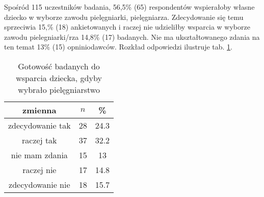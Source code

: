 


Spośród 115 uczestników badania, 56,5\% (65) respondentów wspierałoby własne dziecko w wyborze zawodu pielęgniarki, pielęgniarza. Zdecydowanie się temu sprzeciwia 15,\% (18) ankietowanych i raczej nie udzieliłby wsparcia w wyborze zawodu pielegniarki/rza 14,8\% (17) badanych. Nie ma ukształtowanego zdania na ten temat 13\% (15) opniniodawców. Rozkład odpowiedzi ilustruje tab. \ref{tab:Q37}.

\begin{table}[H]
\caption{Gotowość badanych do wsparcia dziecka, gdyby wybrało pielęgniarstwo}
\centering
\begin{tabular}{ | c | c | c |}
\hline
zmienna & $n$ & \% \\
\hline
zdecydowanie tak  &  28  & 24.3 \\
\hline
raczej tak  &  37  & 32.2 \\
\hline
nie mam zdania  &  15  & 13 \\
\hline
raczej nie  &  17  & 14.8 \\
\hline
zdecydowanie nie  &  18  & 15.7 \\
\hline
\end{tabular}
\label{tab:Q37}
\end{table}

